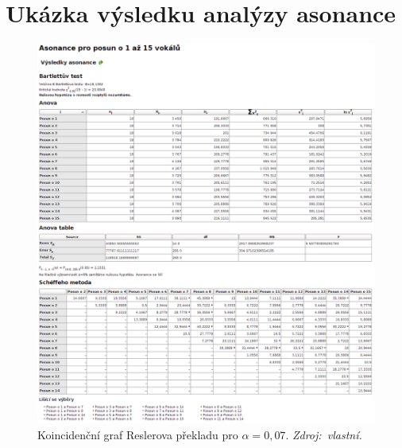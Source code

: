 \documentclass[dp.tex]{subfiles}
\begin{document}
\chapter{Ukázka výsledku analýzy asonance}
\label{appendix:asonance}
\begin{figure}[H]
	\centering
	\includegraphics[max width=\textwidth,keepaspectratio=true]{imgs-70-prakticka/assonance}
	\caption[Koincidenční graf Reslerova překladu pro $\alpha = 0{,}07$.]{Koincidenční graf Reslerova překladu pro $\alpha = 0{,}07$. \textit{Zdroj:~vlastní.}}
	\label{fig:denotation-resler-007}
\end{figure}
\end{document}
